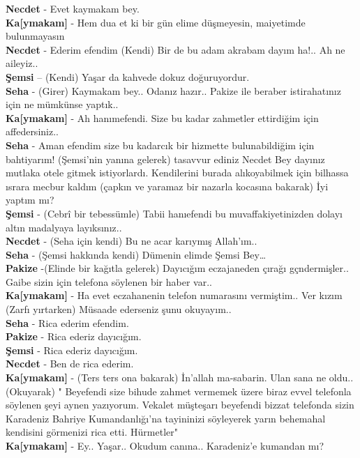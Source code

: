 \documentclass[]{book}
\begin{document}
\textbf{Necdet} - Evet kaymakam bey.\\
\textbf{Ka{[}ymakam{]}} - Hem dua et ki bir gün elime düşmeyesin, maiyetimde bulunmayasın\\
\textbf{Necdet} - Ederim efendim (Kendi) Bir de bu adam akrabam dayım ha!.. Ah ne aileyiz..\\
\textbf{Şemsi} -- (Kendi) Yaşar da kahvede dokuz doğuruyordur.\\
\textbf{Seha} - (Girer) Kaymakam bey.. Odanız hazır.. Pakize ile beraber istirahatınız için ne mümkünse yaptık..\\
\textbf{Ka{[}ymakam{]}} - Ah hanımefendi. Size bu kadar zahmetler ettirdiğim için affedersiniz..\\
\textbf{Seha} - Aman efendim size bu kadarcık bir hizmette bulunabildiğim için bahtiyarım! (Şemsi'nin yanına gelerek) tasavvur ediniz Necdet Bey dayınız mutlaka otele gitmek istiyorlardı. Kendilerini burada alıkoyabilmek için bilhassa ısrara mecbur kaldım (çapkın ve yaramaz bir nazarla kocasına bakarak) İyi yaptım mı?\\
\textbf{Şemsi} - (Cebrî bir tebessümle) Tabii hanıefendi bu muvaffakiyetinizden dolayı altın madalyaya layıksınız..\\
\textbf{Necdet} - (Seha için kendi) Bu ne acar karıymış Allah'ım..\\
\textbf{Seha} - (Şemsi hakkında kendi) Dümenin elimde Şemsi Bey\ldots{}\\
\textbf{Pakize} -(Elinde bir kağıtla gelerek) Dayıcığım eczajaneden çırağı gçndermişler.. Gaibe sizin için telefona söylenen bir haber var..\\
\textbf{Ka{[}ymakam{]}} - Ha evet eczahanenin telefon numarasını vermiştim.. Ver kızım (Zarfı yırtarken) Müsaade ederseniz şunu okuyayım..\\
\textbf{Seha} - Rica ederim efendim.\\
\textbf{Pakize} - Rica ederiz dayıcığım.\\
\textbf{Şemsi} - Rica ederiz dayıcığım.\\
\textbf{Necdet} - Ben de rica ederim.\\
\textbf{Ka{[}ymakam{]}} - (Ters ters ona bakarak) İn'allah ma-sabarin. Ulan sana ne oldu.. (Okuyarak) " Beyefendi size bihude zahmet vermemek üzere biraz evvel telefonla söylenen şeyi aynen yazıyorum. Vekalet müşteşarı beyefendi bizzat telefonda sizin Karadeniz Bahriye Kumandanlığı'na tayininizi söyleyerek yarın behemahal kendisini görmenizi rica etti. Hürmetler"\\
\textbf{Ka{[}ymakam{]}} - Ey.. Yaşar.. Okudum canına.. Karadeniz'e kumandan mı?\\
\end{document}
